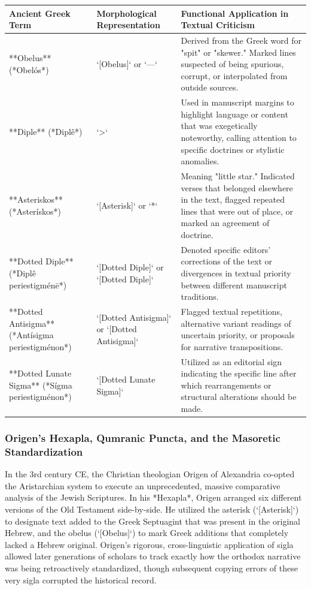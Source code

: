 \documentclass[aps,prd,11pt,onecolumn,superscriptaddress,nofootinbib,floatfix]{revtex4-2}
\begin{document}
\begin{table}[h!]
\centering
\begin{tabular}{p{3cm}p{3cm}p{3cm}}
\hline
Ancient Greek Term & Morphological Representation & Functional Application in Textual Criticism \\
\hline
**Obelus** (*Obelós*) & `[Obelus]` or `---` & Derived from the Greek word for "spit" or "skewer." Marked lines suspected of being spurious, corrupt, or interpolated from outside sources. \\
**Diple** (*Diplê*) & `>` & Used in manuscript margins to highlight language or content that was exegetically noteworthy, calling attention to specific doctrines or stylistic anomalies. \\
**Asteriskos** (*Asterískos*) & `[Asterisk]` or `*` & Meaning "little star." Indicated verses that belonged elsewhere in the text, flagged repeated lines that were out of place, or marked an agreement of doctrine. \\
**Dotted Diple** (*Diplê periestigménē*) & `[Dotted Diple]` or `[Dotted Diple]` & Denoted specific editors' corrections of the text or divergences in textual priority between different manuscript traditions. \\
**Dotted Antisigma** (*Antísigma periestigménon*) & `[Dotted Antisigma]` or `[Dotted Antisigma]` & Flagged textual repetitions, alternative variant readings of uncertain priority, or proposals for narrative transpositions. \\
**Dotted Lunate Sigma** (*Sígma periestigménon*) & `[Dotted Lunate Sigma]` & Utilized as an editorial sign indicating the specific line after which rearrangements or structural alterations should be made. \\
\hline
\end{tabular}
\end{table}



\subsubsection{Origen's Hexapla, Qumranic Puncta, and the Masoretic Standardization}
In the 3rd century CE, the Christian theologian Origen of Alexandria co-opted the Aristarchian system to execute an unprecedented, massive comparative analysis of the Jewish Scriptures. In his *Hexapla*, Origen arranged six different versions of the Old Testament side-by-side. He utilized the asterisk (`[Asterisk]`) to designate text added to the Greek Septuagint that was present in the original Hebrew, and the obelus (`[Obelus]`) to mark Greek additions that completely lacked a Hebrew original. Origen's rigorous, cross-linguistic application of sigla allowed later generations of scholars to track exactly how the orthodox narrative was being retroactively standardized, though subsequent copying errors of these very sigla corrupted the historical record.
\end{document}

